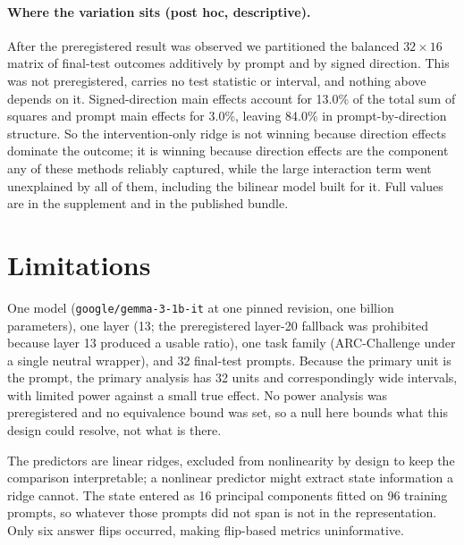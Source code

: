 \documentclass{article}
\begin{document}
\paragraph{Where the variation sits (post hoc, descriptive).} After the preregistered result was
observed we partitioned the balanced $32 \times 16$ matrix of final-test outcomes additively by
prompt and by signed direction. This was not preregistered, carries no test statistic or interval,
and nothing above depends on it. Signed-direction main effects account for 13.0\% of the total sum
of squares and prompt main effects for 3.0\%, leaving 84.0\% in prompt-by-direction structure. So
the intervention-only ridge is not winning because direction effects dominate the outcome; it is
winning because direction effects are the component any of these methods reliably captured, while
the large interaction term went unexplained by all of them, including the bilinear model built for
it. Full values are in the supplement and in the published bundle.

\section{Limitations}

One model (\texttt{google/gemma-3-1b-it} at one pinned revision, one billion parameters), one layer
(13; the preregistered layer-20 fallback was prohibited because layer 13 produced a usable ratio),
one task family (ARC-Challenge under a single neutral wrapper), and 32 final-test prompts. Because
the primary unit is the prompt, the primary analysis has 32 units and correspondingly wide
intervals, with limited power against a small true effect. No power analysis was preregistered and
no equivalence bound was set, so a null here bounds what this design could resolve, not what is
there.

The predictors are linear ridges, excluded from nonlinearity by design to keep the comparison
interpretable; a nonlinear predictor might extract state information a ridge cannot. The state
entered as 16 principal components fitted on 96 training prompts, so whatever those prompts did not
span is not in the representation. Only six answer flips occurred, making flip-based metrics
uninformative.
\end{document}
